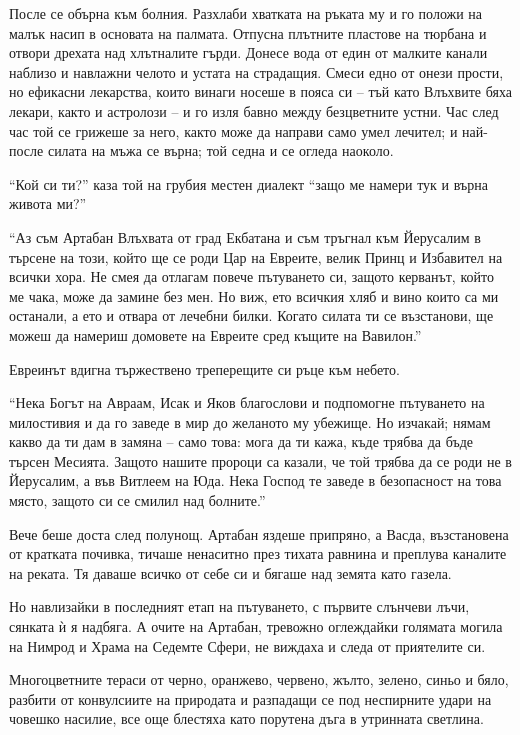\documentclass[oneside,10pt]{memoir}
\begin{document}
После се обърна към болния. Разхлаби хватката на ръката му и го положи на малък
насип в основата на палмата. Отпусна плътните пластове на тюрбана и отвори
дрехата над хлътналите гърди. Донесе вода от един от малките канали наблизо и
навлажни челото и устата на страдащия. Смеси едно от онези прости, но ефикасни
лекарства, които винаги носеше в пояса си -- тъй като Влъхвите бяха лекари,
както и астролози -- и го изля бавно между безцветните устни. Час след час той
се грижеше за него, както може да направи само умел лечител; и най-после силата
на мъжа се върна; той седна и се огледа наоколо.

``Кой си ти?'' каза той на грубия местен диалект ``защо ме намери тук и върна
живота ми?''

``Аз съм Артабан Влъхвата от град Екбатана и съм тръгнал към Йерусалим в търсене
на този, който ще се роди Цар на Евреите, велик Принц и Избавител на всички
хора. Не смея да отлагам повече пътуването си, защото керванът, който ме чака,
може да замине без мен. Но виж, ето всичкия хляб и вино които са ми останали, а
ето и отвара от лечебни билки. Когато силата ти се възстанови, ще можеш да
намериш домовете на Евреите сред къщите на Вавилон.''

Евреинът вдигна тържествено треперещите си ръце към небето.

``Нека Богът на Авраам, Исак и Яков благослови и подпомогне пътуването на
милостивия и да го заведе в мир до желаното му убежище. Но изчакай; нямам какво
да ти дам в замяна -- само това: мога да ти кажа, къде трябва да бъде търсен
Месията. Защото нашите пророци са казали, че той трябва да се роди не в
Йерусалим, а във Витлеем на Юда. Нека Господ те заведе в безопасност на това
място, защото си се смилил над болните.''

Вече беше доста след полунощ. Артабан яздеше припряно, а Васда, възстановена от
кратката почивка, тичаше ненаситно през тихата равнина и преплува каналите на
реката. Тя даваше всичко от себе си и бягаше над земята като газела.

Но навлизайки в последният етап на пътуването, с първите слънчеви лъчи, сянката
ѝ я надбяга. А очите на Артабан, тревожно оглеждайки голямата могила на Нимрод и
Храма на Седемте Сфери, не виждаха и следа от приятелите си.

Многоцветните тераси от черно, оранжево, червено, жълто, зелено, синьо и бяло,
разбити от конвулсиите на природата и разпадащи се под неспирните удари на
човешко насилие, все още блестяха като порутена дъга в утринната светлина.
\end{document}
